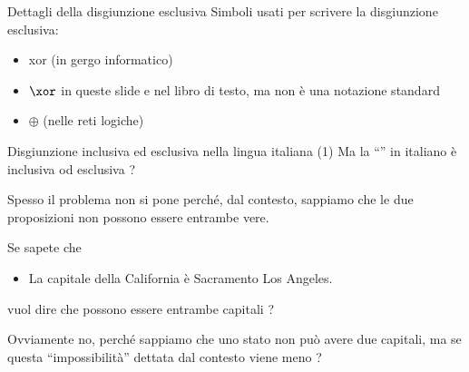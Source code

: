 \documentclass[aspectratio=169,10pt,dvipsnames,handout]{beamer}
\begin{document}
\begin{frame}{Dettagli della disgiunzione esclusiva}
    Simboli usati per scrivere la disgiunzione esclusiva:
    \begin{itemize}
        \item \alert{xor (in gergo informatico)}
        \item \alert{$\xor$ in queste slide e nel libro di testo}, ma non è una notazione standard
        \item $\oplus$ (nelle reti logiche)
    \end{itemize}

\end{frame}

\begin{frame}{Disgiunzione inclusiva ed esclusiva nella lingua italiana (1)}
    Ma la ``'' in italiano è inclusiva od esclusiva ?

    \pause
    \medskip
    Spesso il problema non si pone perché, dal contesto, sappiamo che le due proposizioni non possono essere entrambe vere.
    \begin{example}
        Se sapete che
        \begin{itemize}
            \item La capitale della California è Sacramento  Los Angeles.
        \end{itemize}
        vuol dire che possono essere entrambe capitali ?
    \end{example}

    \pause
    Ovviamente no, perché sappiamo che uno stato non può avere due capitali, ma se questa  ``impossibilità'' dettata dal contesto viene meno ?

\end{frame}
\end{document}
